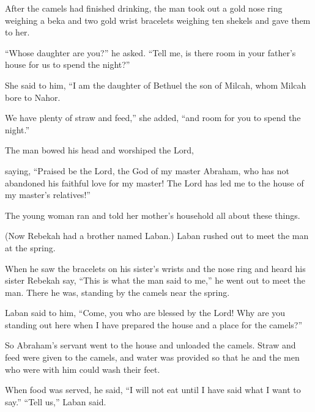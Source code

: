 \begin{scripture}
 After the camels had finished drinking, the man took out a gold nose ring weighing a beka and two gold wrist bracelets weighing ten shekels and gave them to her.
 ``Whose daughter are you?'' he asked. ``Tell me, is there room in your father's house for us to spend the night?''
\everypar{}

 She said to him, ``I am the daughter of Bethuel the son of Milcah, whom Milcah bore to Nahor.
 We have plenty of straw and feed,'' she added, ``and room for you to spend the night.''
\everypar{}

 The man bowed his head and worshiped the Lord,
 saying, ``Praised be the Lord, the God of my master Abraham, who has not abandoned his faithful love for my master! The Lord has led me to the house of my master's relatives!''
\everypar{}

 The young woman ran and told her mother's household all about these things.
 (Now Rebekah had a brother named Laban.) Laban rushed out to meet the man at the spring.
 When he saw the bracelets on his sister's wrists and the nose ring and heard his sister Rebekah say, ``This is what the man said to me,'' he went out to meet the man. There he was, standing by the camels near the spring.
 Laban said to him, ``Come, you who are blessed by the Lord! Why are you standing out here when I have prepared the house and a place for the camels?''
\everypar{}

 So Abraham's servant went to the house and unloaded the camels. Straw and feed were given to the camels, and water was provided so that he and the men who were with him could wash their feet.
 When food was served, he said, ``I will not eat until I have said what I want to say.'' ``Tell us,'' Laban said.
\everypar{}


\end{scripture}
